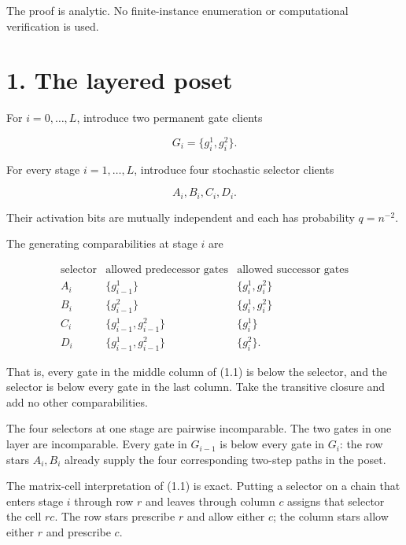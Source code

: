 \documentclass[11pt,a4paper]{article}
\begin{document}
The proof is analytic.  No finite-instance enumeration or computational verification is used.


\section*{1. The layered poset}

For \(i=0,\ldots,L\), introduce two permanent gate clients


\[
                         G_i=\{g_i^1,g_i^2\}.
\]

For every stage \(i=1,\ldots,L\), introduce four stochastic selector clients


\[
                         A_i,B_i,C_i,D_i.
\]

Their activation bits are mutually independent and each has probability \(q=n^{-2}\).


The generating comparabilities at stage \(i\) are


\begin{equation}
\begin{array}{c|c|c}
\text{selector}&\text{allowed predecessor gates}
               &\text{allowed successor gates}\\ \hline
A_i&\{g_{i-1}^1\}&\{g_i^1,g_i^2\}\\
B_i&\{g_{i-1}^2\}&\{g_i^1,g_i^2\}\\
C_i&\{g_{i-1}^1,g_{i-1}^2\}&\{g_i^1\}\\
D_i&\{g_{i-1}^1,g_{i-1}^2\}&\{g_i^2\}.
\end{array}
\tag{1.1}
\end{equation}

That is, every gate in the middle column of (1.1) is below the selector, and the selector is below every gate in the last column.  Take the transitive closure and add no other comparabilities.


The four selectors at one stage are pairwise incomparable.  The two gates in one layer are incomparable.  Every gate in \(G_{i-1}\) is below every gate in \(G_i\): the row stars \(A_i,B_i\) already supply the four corresponding two-step paths in the poset.


The matrix-cell interpretation of (1.1) is exact.  Putting a selector on a chain that enters stage \(i\) through row \(r\) and leaves through column \(c\) assigns that selector the cell \(rc\).  The row stars prescribe \(r\) and allow either \(c\); the column stars allow either \(r\) and prescribe \(c\).
\end{document}
